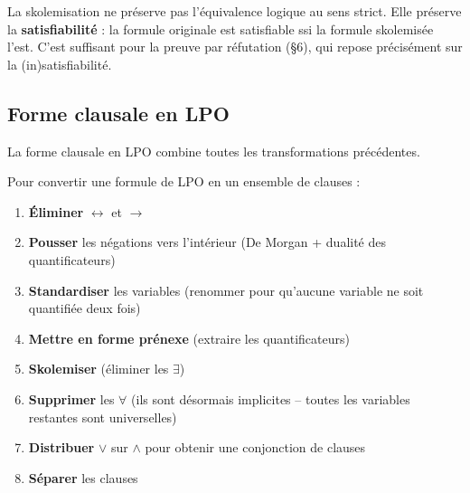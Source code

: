 \documentclass[11pt,a4paper]{article}
\begin{document}
\begin{attentionbox}
La skolemisation ne préserve pas l'équivalence logique au sens strict. Elle préserve la \textbf{satisfiabilité} : la formule originale est satisfiable ssi la formule skolemisée l'est. C'est suffisant pour la preuve par réfutation (§6), qui repose précisément sur la (in)satisfiabilité.
\end{attentionbox}

\subsection{Forme clausale en LPO}

La forme clausale en LPO combine toutes les transformations précédentes.

\begin{recipebox}
Pour convertir une formule de LPO en un ensemble de clauses :
\begin{enumerate}
    \item \textbf{Éliminer} $\leftrightarrow$ et $\rightarrow$
    \item \textbf{Pousser} les négations vers l'intérieur (De Morgan + dualité des quantificateurs)
    \item \textbf{Standardiser} les variables (renommer pour qu'aucune variable ne soit quantifiée deux fois)
    \item \textbf{Mettre en forme prénexe} (extraire les quantificateurs)
    \item \textbf{Skolemiser} (éliminer les $\exists$)
    \item \textbf{Supprimer} les $\forall$ (ils sont désormais implicites -- toutes les variables restantes sont universelles)
    \item \textbf{Distribuer} $\lor$ sur $\land$ pour obtenir une conjonction de clauses
    \item \textbf{Séparer} les clauses
\end{enumerate}
\end{recipebox}
\end{document}
